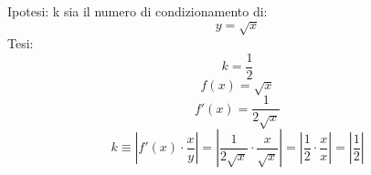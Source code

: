 Ipotesi: k sia il numero di condizionamento di:
\[
y = \sqrt{x}
\]
Tesi:
\[
k=\frac{1}{2}
\]
\[
f(x) = \sqrt{x}
\]
\[
f'(x) = \frac{1}{2\sqrt{x}}
\]
\[
k \equiv |f'(x) \cdot \frac{x}{y} | = | \frac{1}{2\sqrt{x}} \cdot \frac{x}{ \sqrt{x} } | = | \frac{1}{2} \cdot \frac{x}{x} | = | \frac{1}{2}|
\]
